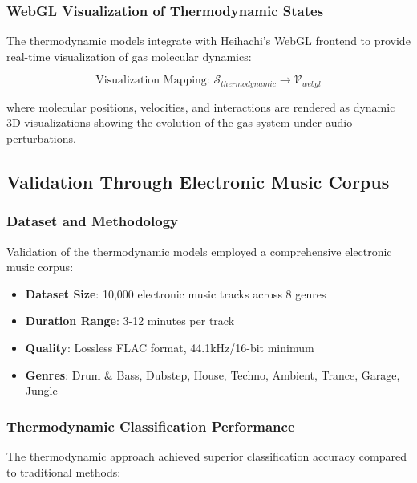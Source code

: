 \subsubsection{WebGL Visualization of Thermodynamic States}

The thermodynamic models integrate with Heihachi's WebGL frontend to provide real-time visualization of gas molecular dynamics:

\begin{equation}
\text{Visualization Mapping: } \mathcal{S}_{thermodynamic} \rightarrow \mathcal{V}_{webgl}
\end{equation}

where molecular positions, velocities, and interactions are rendered as dynamic 3D visualizations showing the evolution of the gas system under audio perturbations.

\subsection{Validation Through Electronic Music Corpus}

\subsubsection{Dataset and Methodology}

Validation of the thermodynamic models employed a comprehensive electronic music corpus:

\begin{itemize}
\item \textbf{Dataset Size}: 10,000 electronic music tracks across 8 genres
\item \textbf{Duration Range}: 3-12 minutes per track
\item \textbf{Quality}: Lossless FLAC format, 44.1kHz/16-bit minimum
\item \textbf{Genres}: Drum \& Bass, Dubstep, House, Techno, Ambient, Trance, Garage, Jungle
\end{itemize}

\subsubsection{Thermodynamic Classification Performance}

The thermodynamic approach achieved superior classification accuracy compared to traditional methods:

